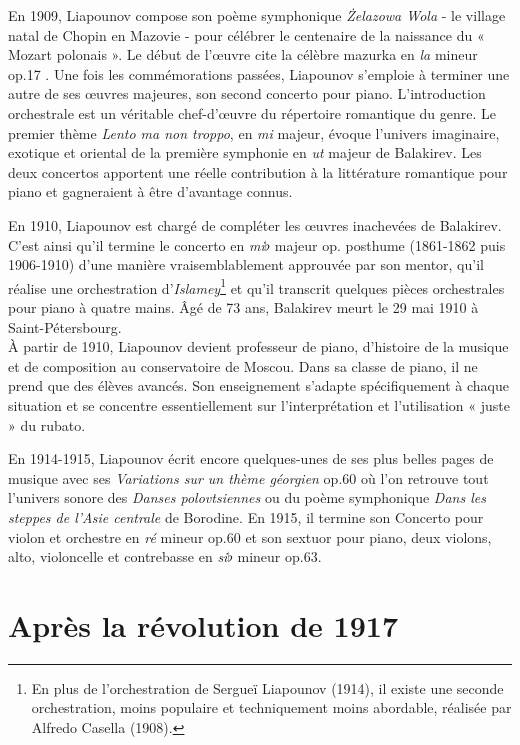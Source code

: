 En 1909, Liapounov compose son poème symphonique \emph{Żelazowa Wola} - le village natal de Chopin en Mazovie - pour célébrer le centenaire de la naissance du « Mozart polonais ». Le début de l'œuvre cite la célèbre mazurka en \emph{la} mineur op.17 . Une fois les commémorations passées, Liapounov s'emploie à terminer une autre de ses œuvres majeures, son second concerto pour piano. L'introduction orchestrale est un véritable chef-d'œuvre du répertoire romantique du genre. Le premier thème \emph{Lento ma non troppo}, en \emph{mi} majeur, évoque l'univers imaginaire, exotique et oriental de la première symphonie en \emph{ut} majeur de Balakirev. Les deux concertos apportent une réelle contribution à la littérature romantique pour piano et gagneraient à être d'avantage connus.

En 1910, Liapounov est chargé de compléter les œuvres inachevées de Balakirev. C'est ainsi qu'il termine le concerto en \emph{mi}$\flat$ majeur op. posthume (1861-1862 puis 1906-1910) d'une manière vraisemblablement approuvée par son mentor, qu'il réalise une orchestration d'\emph{Islamey}\footnote{En plus de l'orchestration de Sergueï Liapounov (1914), il existe une seconde orchestration, moins populaire et techniquement moins abordable, réalisée par Alfredo Casella (1908).} et qu'il transcrit quelques pièces orchestrales pour piano à quatre mains. Âgé de 73 ans, Balakirev meurt le 29 mai 1910 à Saint-Pétersbourg.\\

À partir de 1910, Liapounov devient professeur de piano, d'histoire de la musique et de composition au conservatoire de Moscou. Dans sa classe de piano, il ne prend que des élèves avancés. Son enseignement s'adapte spécifiquement à chaque situation et se concentre essentiellement sur l'interprétation et l'utilisation « juste » du rubato.

\newpage

En 1914-1915, Liapounov écrit encore quelques-unes de ses plus belles pages de musique avec ses \emph{Variations sur un thème géorgien} op.60 où l'on retrouve tout l'univers sonore des \emph{Danses polovtsiennes} ou du poème symphonique \emph{Dans les steppes de l'Asie centrale} de Borodine. En 1915, il termine son Concerto pour violon et orchestre en \emph{ré} mineur op.60 et son sextuor pour piano, deux violons, alto, violoncelle et contrebasse en \emph{si}$\flat$ mineur op.63.\\

\section{Après la révolution de 1917}

